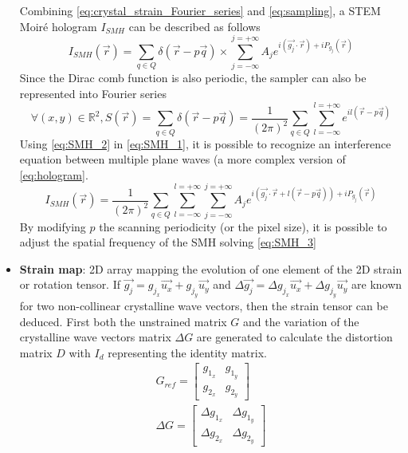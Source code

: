 \documentclass[12pt]{article}
\begin{document}
\begin{itemize}
Combining \cref{eq:crystal_strain_Fourier_series} and \cref{eq:sampling}, a STEM Moir{\'e} hologram $I_{SMH}$ can be described as follows
\begin{equation}
I_{SMH}(\vec{r})=\sum_{q\in Q}\delta(\vec{r}-p\vec{q})\times\sum_{j=-\infty}^{j=+\infty}A_je^{i(\vec{g_j}\cdot\vec{r})+iP_{g_{j}}(\vec{r})}
\label{eq:SMH_1}
\end{equation}
Since the Dirac comb function is also periodic, the sampler can also be represented into Fourier series
\begin{equation}
\forall (x,y) \in \mathbb{R}^{2}, S(\vec{r})=\sum_{q\in Q}\delta(\vec{r}-p\vec{q}) = \frac{1}{(2\pi)^2}\sum_{q\in Q}\sum_{l=-\infty}^{l=+\infty}e^{il(\vec{r}-p\vec{q})}
\label{eq:SMH_2}
\end{equation}
Using \cref{eq:SMH_2} in \cref{eq:SMH_1}, it is possible to recognize an interference equation between multiple plane waves (a more complex version of \cref{eq:hologram}.
\begin{equation}
I_{SMH}(\vec{r})=\frac{1}{(2\pi)^2}\sum_{q\in Q}\sum_{l=-\infty}^{l=+\infty}\sum_{j=-\infty}^{j=+\infty}A_je^{i(\vec{g_j}\cdot\vec{r}+l(\vec{r}-p\vec{q}))+iP_{g_{j}}(\vec{r})}
\label{eq:SMH_3}
\end{equation}
By modifying $p$ the scanning periodicity (or the pixel size), it is possible to adjust the spatial frequency of the SMH solving \cref{eq:SMH_3} 
\item \textbf{Strain map}: 2D array mapping the evolution of one element of the 2D strain or rotation 
tensor.\newline
If $\vec{g_j}=g_{j_{x}}\vec{u_{x}}+g_{j_{y}}\vec{u_{y}}$ and $\Delta \vec{g_{j}}=\Delta g_{j_{x}}\vec{u_{x}}+\Delta g_{j_{y}}\vec{u_{y}}$ are known for two non-collinear crystalline wave vectors, then the strain tensor can be deduced. First both the unstrained matrix $G$ and the variation of the crystalline wave vectors matrix $\Delta G$ are generated to calculate the distortion matrix $D$ with $I_{d}$ representing the identity matrix. 
\begin{equation}
\begin{gathered}
	G_{ref} =
	\begin{bmatrix}
	g_{1_{x}} & g_{1_{y}} \\
	g_{2_{x}} & g_{2_{y}} 
	\end{bmatrix} \\
	\Delta G =
	\begin{bmatrix}
	\Delta g_{1_{x}} & \Delta g_{1_{y}} \\
	\Delta g_{2_{x}} & \Delta g_{2_{y}} 

\end{bmatrix}
\end{gathered}
\end{equation}
\end{itemize}
\end{document}
